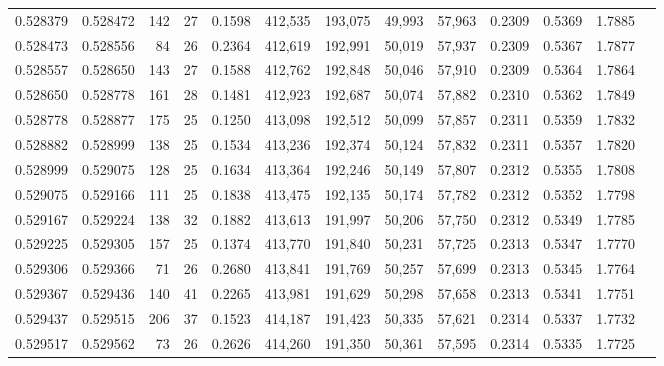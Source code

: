 \begin{tabular}{rrrrrrrrrrrrr}
0.528379 & 0.528472 & 142 &  27 &                                     0.1598 & 412,535 & 193,075 &  49,993 &  57,963 & 0.2309 & 0.5369 & 1.7885 \\
0.528473 & 0.528556 &  84 &  26 &                                     0.2364 & 412,619 & 192,991 &  50,019 &  57,937 & 0.2309 & 0.5367 & 1.7877 \\
0.528557 & 0.528650 & 143 &  27 &                                     0.1588 & 412,762 & 192,848 &  50,046 &  57,910 & 0.2309 & 0.5364 & 1.7864 \\
0.528650 & 0.528778 & 161 &  28 &                                     0.1481 & 412,923 & 192,687 &  50,074 &  57,882 & 0.2310 & 0.5362 & 1.7849 \\
0.528778 & 0.528877 & 175 &  25 &                                     0.1250 & 413,098 & 192,512 &  50,099 &  57,857 & 0.2311 & 0.5359 & 1.7832 \\
0.528882 & 0.528999 & 138 &  25 &                                     0.1534 & 413,236 & 192,374 &  50,124 &  57,832 & 0.2311 & 0.5357 & 1.7820 \\
0.528999 & 0.529075 & 128 &  25 &                                     0.1634 & 413,364 & 192,246 &  50,149 &  57,807 & 0.2312 & 0.5355 & 1.7808 \\
0.529075 & 0.529166 & 111 &  25 &                                     0.1838 & 413,475 & 192,135 &  50,174 &  57,782 & 0.2312 & 0.5352 & 1.7798 \\
0.529167 & 0.529224 & 138 &  32 &                                     0.1882 & 413,613 & 191,997 &  50,206 &  57,750 & 0.2312 & 0.5349 & 1.7785 \\
0.529225 & 0.529305 & 157 &  25 &                                     0.1374 & 413,770 & 191,840 &  50,231 &  57,725 & 0.2313 & 0.5347 & 1.7770 \\
0.529306 & 0.529366 &  71 &  26 &                                     0.2680 & 413,841 & 191,769 &  50,257 &  57,699 & 0.2313 & 0.5345 & 1.7764 \\
0.529367 & 0.529436 & 140 &  41 &                                     0.2265 & 413,981 & 191,629 &  50,298 &  57,658 & 0.2313 & 0.5341 & 1.7751 \\
0.529437 & 0.529515 & 206 &  37 &                                     0.1523 & 414,187 & 191,423 &  50,335 &  57,621 & 0.2314 & 0.5337 & 1.7732 \\
0.529517 & 0.529562 &  73 &  26 &                                     0.2626 & 414,260 & 191,350 &  50,361 &  57,595 & 0.2314 & 0.5335 & 1.7725 \\

\end{tabular}
